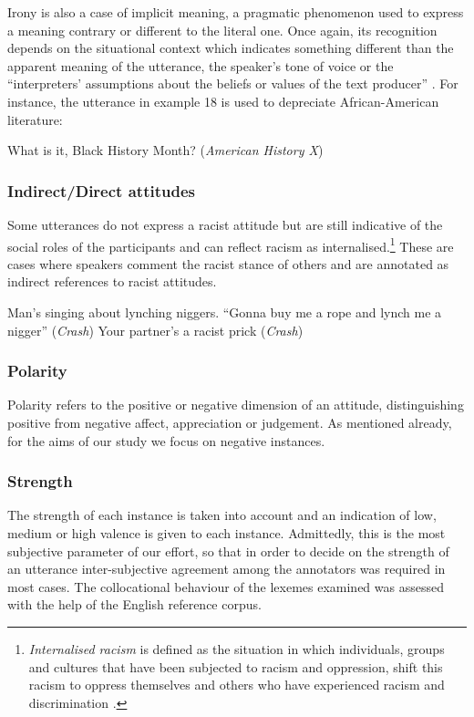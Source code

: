 \documentclass[output=paper]{LSP/langsci}
\begin{document}
Irony is also a case of implicit meaning, a pragmatic phenomenon used to express a meaning contrary or different to the literal one. Once again, its recognition depends on the situational context which indicates something different than the apparent meaning of the utterance, the speaker's tone of voice or the “interpreters' assumptions about the beliefs or values of the text producer”  \citep[123]{Fairclough1992}. For instance, the utterance in example 18 is used to depreciate African-American literature:

\ea \label{ex:2:18} What is it, Black History Month? (\textit{American History X})
\z

\subsubsection{Indirect/Direct attitudes}
Some utterances do not express a racist attitude but are still indicative of the social roles of the participants and can reflect racism as internalised.\footnote{\textit{Internalised racism} is defined as the situation in which individuals, groups and cultures that have been subjected to racism and oppression, shift this racism to oppress themselves and others who have experienced racism and discrimination \citep[92]{Lawrence2002}.} These are cases where speakers comment the racist stance of others and are annotated as indirect references to racist attitudes.\newline

\ea \label{ex:2:19} Man's singing about lynching niggers. “Gonna buy me a rope and lynch me a nigger” (\textit{Crash})
\z
\ea \label{ex:2:20} Your partner's a racist prick (\textit{Crash})
\z

\subsubsection{Polarity}
Polarity refers to the positive or negative dimension of an attitude, distinguishing positive from negative affect, appreciation or judgement. As mentioned already, for the aims of our study we focus on negative instances.

\subsubsection{Strength} 
The strength of each instance is taken into account and an indication of low, medium or high valence is given to each instance. Admittedly, this is the most subjective parameter of our effort, so that in order to decide on the strength of an utterance inter-subjective agreement among the annotators was required in most cases. The collocational behaviour of the lexemes examined was assessed with the help of the English reference corpus.
\end{document}
